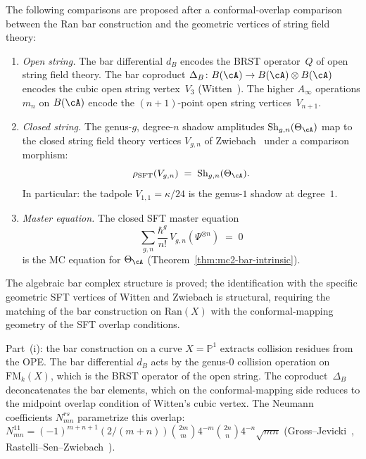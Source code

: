 \begin{remark}

\label{rem:frontier-sft-vertices}
The following comparisons are proposed after a conformal-overlap
comparison between the Ran bar construction and the geometric vertices
of string field theory:
\begin{enumerate}[label=\textup{(\roman*)}]
\item \emph{Open string.}
 The bar differential $d_B$ encodes the BRST
 operator~$Q$ of open string field theory. The bar
 coproduct $\Delta_B \colon B(\cA) \to B(\cA) \otimes B(\cA)$
 encodes the cubic open string vertex~$V_3$
 \textup{(}Witten~\cite{Witten86SFT}\textup{)}.
 The higher $A_\infty$ operations
 $m_n$ on $B(\cA)$ encode the $(n{+}1)$-point open
 string vertices~$V_{n+1}$.

\item \emph{Closed string.}
 The genus-$g$, degree-$n$ shadow amplitudes
 $\mathrm{Sh}_{g,n}(\Theta_\cA)$
 map to the closed string field theory vertices
 $V_{g,n}$ of Zwiebach~\cite{Zwiebach93} under a comparison morphism:
 \begin{equation}\label{eq:frontier-csft-vertex}
 \rho_{\mathrm{SFT}}(V_{g,n})
 \;=\;
 \mathrm{Sh}_{g,n}(\Theta_\cA).
 \end{equation}
 In particular: the tadpole $V_{1,1} = \kappa/24$
 is the genus-$1$ shadow at degree~$1$.

\item \emph{Master equation.}
 The closed SFT master equation
 \[
 \sum_{g,n}
 \frac{\hbar^g}{n!}\,
 V_{g,n}(\Psi^{\otimes n})
 \;=\; 0
 \]
 is the MC equation for
 $\Theta_\cA$
 \textup{(}Theorem~\textup{\ref{thm:mc2-bar-intrinsic}}\textup{)}.
\end{enumerate}

The algebraic bar complex structure is proved; the
identification with the specific geometric SFT vertices of
Witten and Zwiebach is structural, requiring the matching of
the bar construction on $\mathrm{Ran}(X)$ with the conformal-mapping
geometry of the SFT overlap conditions.

Part~(i): the bar construction on a curve $X = \mathbb{P}^1$
extracts collision residues from the OPE. The bar
differential $d_B$ acts by the genus-$0$ collision
operation on $\mathrm{FM}_k(X)$, which is the BRST
operator of the open string. The coproduct~$\Delta_B$
deconcatenates the bar elements, which on the
conformal-mapping side reduces to the midpoint overlap
condition of Witten's cubic vertex. The Neumann
coefficients $N^{rs}_{mn}$ parametrize this overlap:
$N^{11}_{mn} = (-1)^{m+n+1}(2/(m+n))
\binom{2m}{m}4^{-m}\binom{2n}{n}4^{-n}\sqrt{mn}$
(Gross--Jevicki~\cite{Gross-Jevicki87},
Rastelli--Sen--Zwiebach~\cite{RSZ01}).


\end{remark}
